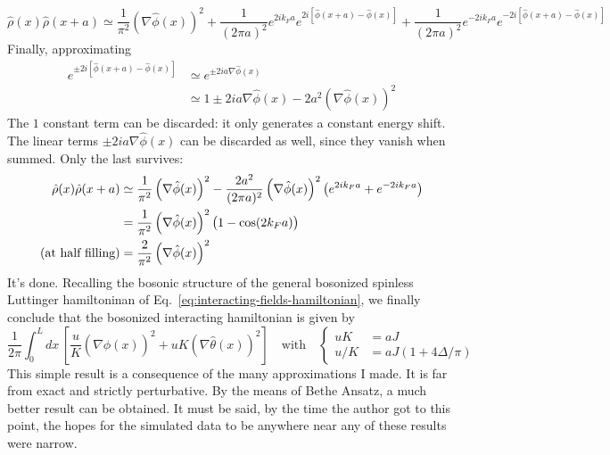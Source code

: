 \[
	\hat \rho(x) \hat \rho (x+a) \simeq \frac{1}{\pi^2} \left( \nabla \hat \phi(x) \right)^2
	+ \frac{1}{(2\pi a)^2} e^{2ik_F a} e^{2i \left[ \hat \phi(x+a) - \hat \phi(x) \right]} + \frac{1}{(2\pi a)^2} e^{-2ik_F a} e^{-2i \left[ \hat \phi(x+a) - \hat \phi(x) \right]}
\]
Finally, approximating
\[
	\begin{aligned}
		e^{\pm 2i \left[ \hat \phi(x+a) - \hat \phi(x) \right]} &\simeq e^{\pm 2ia \nabla \hat \phi(x)} \\
		&\simeq 1 \pm 2ia \nabla \hat \phi(x) - 2a^2 \left( \nabla \hat \phi(x) \right)^2
	\end{aligned}
\]
The $1$ constant term can be discarded: it only generates a constant energy shift. The linear terms $ \pm 2ia \nabla \hat \phi(x)$ can be discarded as well, since they vanish when summed. Only the last survives:
\[
	\begin{aligned}
		\hat \rho(x) \hat \rho (x+a) &\simeq \frac{1}{\pi^2} \left( \nabla \hat \phi(x) \right)^2 
		- \frac{2a^2}{(2\pi a)^2} \left( \nabla \hat \phi(x) \right)^2 \left(
			e^{2ik_F a} + e^{-2ik_F a}
		\right) \\
		&= \frac{1}{\pi^2} \left( \nabla \hat \phi(x) \right)^2 \left(
			\vphantom{A^A}
			1 - \cos(2k_F a)
		\right) \\
		\text{(at half filling)} &= \frac{2}{\pi^2} \left( \nabla \hat \phi(x) \right)^2
	\end{aligned}
\]
It's done. Recalling the bosonic structure of the general bosonized spinless Luttinger hamiltoninan of Eq.~\eqref{eq:interacting-fields-hamiltonian}, we finally conclude that the bosonized interacting hamiltonian is given by
\begin{equation}\label{eq:XXZ-luttinger-hamiltonian}
	\frac{1}{2\pi} \int_0^L dx \, \left[ \frac{u}{K} \left( \nabla \hat \phi(x) \right)^2 + uK \left( \nabla \hat \theta(x) \right)^2 \right]
	\quad\text{with}\quad
	\begin{cases}
		uK &= aJ \\
		u/K &= aJ \left(
			1 + 4\Delta/\pi
		\right)
	\end{cases}
\end{equation}
This simple result is a consequence of the many approximations I made. It is far from exact and strictly perturbative. By the means of Bethe Ansatz, a much better result can be obtained. It must be said, by the time the author got to this point, the hopes for the simulated data to be anywhere near any of these results were narrow.
